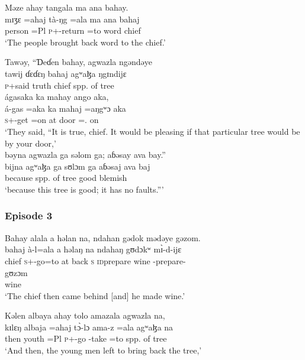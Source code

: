 \ea   Məze  ahay  tangala  ma  ana  bahay.\\
 \gll mɪʒɛ  =ahaj   tà-ŋg          =ala  ma      ana  bahaj\\
  person   =Pl    \textsc{p}+{\PFV}-return  =to   word  {\DAT}  chief\\
  \glt ‘The people brought back word to the chief.’
  \z

\ea   Tawəy,  “Ɗeɗen  bahay,  agwazla  ngəndəye \\
  \gll tawij     ɗɛɗɛŋ   bahaj    agʷaɮa  ŋgɪndijɛ \\  
  \textsc{p}+said  truth     chief     {spp. of tree}    {\DEM}  \\
  
  \medskip  
 ágasaka  ka  mahay  ango  aka, \\
\gll   á-gas       =aka   ka    mahaj    =aŋgʷɔ aka\\
  \textsc{s}+{\IFV}-get =on    at   door    ={\twoS}.{\POSS} on\\
  \glt ‘They said, “It is true, chief. It would be pleasing if that particular tree would be by your door,’\\
  
  \medskip
 bəyna  agwazla  ga  səlom  ga;  aɓəsay  ava  bay.”\\
 \gll bijna      agʷaɮa  ga    sʊlɔm ga  aɓəsaj  ava     baj\\ 
 because   {spp. of tree}  {\ADJ}   good   {\ADJ}   blemish   {\EXT}  {\NEG}\\
  \glt ‘because this tree is good;  it has no faults.”’
  \z
  
 \subsubsection*{Episode 3}
\ea   Bahay  alala  a  həlan  na,  ndahan  gədok  mədəye  gəzom.\\
\gll  bahaj  à-l=ala    a   həlaŋ   na  ndahaŋ  gʊdɔkʷ m\`ɪ-d-ijɛ\\      
 chief   \textsc{s}+{\PFV}-go=to   at   back   {\PSP}  \textsc{s}        {\textsc{id}prepare wine}  {\NOM}-prepare-{\CL}\\ 
 
 \medskip
 \gll gʊzɔm\\
      wine \\
 \glt ‘The chief then came behind [and] he made wine.’
 \z
 
\ea  Kəlen  albaya  ahay  tolo  amazala  agwazla  na,\\
 \gll kɪlɛŋ  albaja    =ahaj    t\`ɔ-lɔ      ama-z     =ala   agʷaɮa  na\\
 then   youth   =Pl      \textsc{p}+{\PFV}-go   {\DEP}-take  =to  {spp. of tree}  {\PSP}\\
 \glt ‘And then, the young men left to bring back the tree,’\\
 
